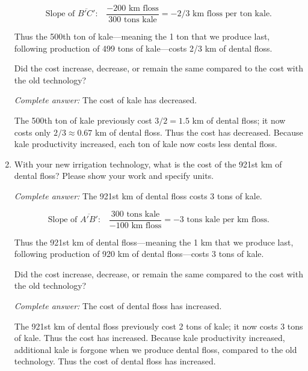 \documentclass[
    letterpaper,paper=portrait,fleqn,
    DIV=16,fontsize=12pt,twoside=semi,
    parskip=full-,
    headings=standardclasses]
{scrartcl}
\begin{document}
\begin{enumerate}
\begin{solution}
$$\text{Slope of $\overline{B'C'}$:} \quad \frac{-200\text{ km floss}}{300\text{ tons kale}} = -2/3 \text{ km floss per ton kale}.$$

Thus the 500th ton of kale---meaning the 1 ton that we produce last, following production of 499 tons of kale---costs 2/3 km of dental floss.
\end{solution}

Did the cost increase, decrease, or remain the same compared to the cost with the old technology?

\begin{solution}
\emph{Complete answer:} The cost of kale has decreased.

The 500th ton of kale previously cost $3/2=1.5$ km of dental floss; it now costs only $2/3\approx0.67$ km of dental floss. Thus the cost has decreased. Because kale productivity increased, each ton of kale now costs less dental floss.
\end{solution}

\item With your new irrigation technology, what is the cost of the 921st km of dental floss? Please show your work and specify units.

\begin{solution}
\emph{Complete answer:} The 921st km of dental floss costs 3 tons of kale.

$$\text{Slope of $\overline{A'B'}$:} \quad \frac{300\text{ tons kale}}{-100\text{ km floss}} = -3 \text{ tons kale per km floss}.$$

Thus the 921st km of dental floss---meaning the 1 km that we produce last, following production of 920 km of dental floss---costs 3 tons of kale.
\end{solution}

Did the cost increase, decrease, or remain the same compared to the cost with the old technology?

\begin{solution}
\emph{Complete answer:} The cost of dental floss has increased.

The 921st km of dental floss previously cost 2 tons of kale; it now costs 3 tons of kale. Thus the cost has increased. Because kale productivity increased, additional kale is forgone when we produce dental floss, compared to the old technology. Thus the cost of dental floss has increased.
\end{solution}

\end{enumerate}
\end{document}
